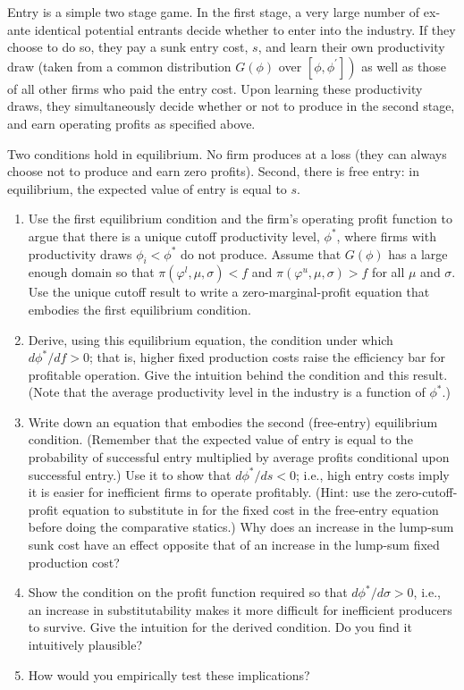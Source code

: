 \documentclass[10pt]{article}
\begin{document}
Entry is a simple two stage game. In the first stage, a very large number of ex-ante identical potential entrants decide whether to enter into the industry. If they choose to do so, they pay a sunk entry cost, $s$, and learn their own productivity draw (taken from a common distribution $G(\phi)$ over $\left.\left[\phi, \phi^{\prime}\right]\right)$ as well as those of all other firms who paid the entry cost. Upon learning these productivity draws, they simultaneously decide whether or not to produce in the second stage, and earn operating profits as specified above.

Two conditions hold in equilibrium. No firm produces at a loss (they can always choose not to produce and earn zero profits). Second, there is free entry: in equilibrium, the expected value of entry is equal to $s$.

\begin{enumerate}[label=\alph*.]
    \item Use the first equilibrium condition and the firm's operating profit function to argue that there is a unique cutoff productivity level, $\phi^*$, where firms with productivity draws $\phi_i<\phi^*$ do not produce. Assume that $G(\phi)$ has a large enough domain so that $\pi\left(\varphi^l, \mu, \sigma\right)<f$ and $\pi\left(\varphi^u, \mu, \sigma\right)>f$ for all $\mu$ and $\sigma$. Use the unique cutoff result to write a zero-marginal-profit equation that embodies the first equilibrium condition.
    \item Derive, using this equilibrium equation, the condition under which $d \phi^* / d f>0$; that is, higher fixed production costs raise the efficiency bar for profitable operation. Give the intuition behind the condition and this result. (Note that the average productivity level in the industry is a function of $\phi^*$.)
    \item Write down an equation that embodies the second (free-entry) 
        equilibrium condition. (Remember that the expected value of entry is equal 
        to the probability of successful entry multiplied by average profits 
        conditional upon successful entry.) Use it to show that $d \phi^* / d s<0$; 
        i.e., high entry costs imply it is easier for inefficient firms to operate 
        profitably. (Hint: use the zero-cutoff-profit equation to substitute in for 
        the fixed cost in the free-entry equation before doing the comparative statics.) Why does an increase in the lump-sum sunk cost have an effect opposite that of an increase in the lump-sum fixed production cost?
    \item Show the condition on the profit function required so that $d \phi^* / d \sigma>0$, i.e., an increase in substitutability makes it more difficult for inefficient producers to survive. Give the intuition for the derived condition. Do you find it intuitively plausible?
    \item How would you empirically test these implications?
\end{enumerate}
\end{document}
